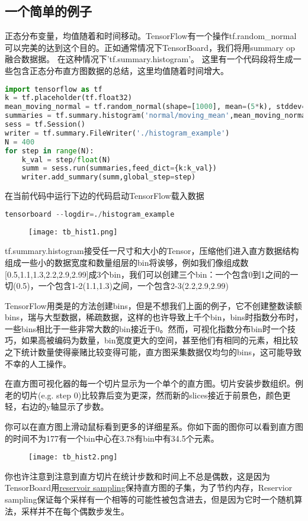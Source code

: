 \subsection{一个简单的例子}
正态分布变量，均值随着和时间移动。TensorFlow有一个操作tf.random\_normal可以完美的达到这个目的。正如通常情况下TensorBoard，我们将用summary op融合数据据。
在这种情况下'tf.summary.histogram'。
这里有一个代码段将生成一些包含正态分布直方图数据的总结，这里均值随着时间增大。
\begin{lstlisting}[language=Python]
import tensorflow as tf
k = tf.placeholder(tf.float32)
mean_moving_normal = tf.random_normal(shape=[1000], mean=(5*k), stddev=1)
summaries = tf.summary.histogram('normal/moving_mean',mean_moving_normal)
sess = tf.Session()
writer = tf.summary.FileWriter('./histogram_example')
N = 400
for step in range(N):
    k_val = step/float(N)
    summ = sess.run(summaries,feed_dict={k:k_val})
    writer.add_summary(summ,global_step=step)
\end{lstlisting}
在当前代码中运行下边的代码启动TensorFlow载入数据
\begin{lstlisting}[language=Python]
tensorboard --logdir=./histogram_example
\end{lstlisting}
\begin{center}
\begin{figure}[H]
\texttt{[image: tb\_hist1.png]}
\end{figure}
\end{center}
tf.summary.histogram接受任一尺寸和大小的Tensor，压缩他们进入直方数据结构组成一些小的数据宽度和数量组层的bin将诶够，例如我们像组成数[0.5,1.1,1.3,2.2,2.9,2.99]成3个bin，我们可以创建三个bin：一个包含0到1之间的一切(0.5)，一个包含1-2(1.1,1.3)之间，一个包含2-3(2.2,2.9,2.99)

  TensorFlow用类是的方法创建bins，但是不想我们上面的例子，它不创建整数读额bins，瑞与大型数据，稀疏数据，这样的也许导致上千个bin，bins时指数分布时，一些bins相比于一些非常大数的bin接近于0。然而，可视化指数分布bin时一个技巧，如果高被编码为数量，bin宽度更大的空间，甚至他们有相同的元素，相比较之下统计数量使得豪赌比较变得可能，直方图采集数据仅均匀的bins，这可能导致不幸的人工操作。

在直方图可视化器的每一个切片显示为一个单个的直方图。切片安装步数组织。例老的切片(e.g. step 0)比较靠后变为更深，然而新的slices接近于前景色，颜色更轻，右边的y轴显示了步数。

你可以在直方图上滑动鼠标看到更多的详细星系。你如下面的图你可以看到直方图的时间不为177有一个bin中心在3.78有bin中有34.5个元素。
\begin{center}
\begin{figure}[H]
\texttt{[image: tb\_hist2.png]}
\end{figure}
\end{center}
你也许注意到注意到直方切片在统计步数和时间上不总是偶数，这是因为TensorBoard用\href{https://en.wikipedia.org/wiki/Reservoir\_sampling}{reservoir sampling}保持直方图的子集，为了节约内存，Reservior sampling保证每个采样有一个相等的可能性被包含进去，但是因为它时一个随机算法，采样并不在每个偶数步发生。
